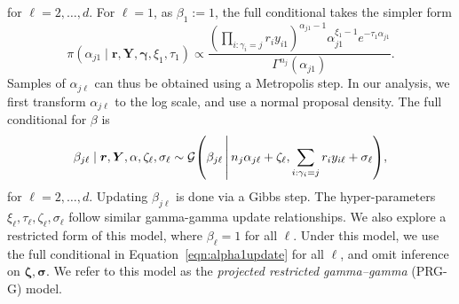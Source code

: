 for $\ell = 2,\ldots,d$.  For $\ell = 1$, as $\beta_{1} := 1$, the full conditional takes the simpler form
\begin{equation}
    \label{eqn:alpha1update}
    \pi(\alpha_{j1}\mid\bm{r},\bm{Y},\bm{\gamma},\xi_1,\tau_1)
    \propto \frac{\left(\prod_{i:\gamma_i = j}r_iy_{i1}\right)^{\alpha_{j1} - 1}\alpha_{j1}^{\xi_1 - 1}e^{-\tau_1\alpha_{j1}}}{\Gamma^{n_j}(\alpha_{j1})}.
\end{equation}
Samples of $\alpha_{j\ell}$ can thus be obtained using a Metropolis step. In our analysis, we first transform $\alpha_{j\ell}$ to the log scale, and use a normal proposal density.
The full conditional for $\beta$ is 
\begin{equation}
    \label{eqn:betafc}
    \beta_{j\ell}\mid\bm{r},\bm{Y},\alpha,\zeta_{\ell},\sigma_{\ell}
    \sim \mathcal{G}\left(\beta_{j\ell}\bigmid n_j\alpha_{j\ell} + \zeta_\ell, \sum_{i:\gamma_i = j}r_iy_{i\ell} + \sigma_{\ell}\right),
\end{equation}
for $\ell = 2,\ldots, d$.  Updating $\beta_{j\ell}$ is done via a Gibbs step.  The hyper-parameters
$\xi_{\ell},\tau_{\ell},\zeta_{\ell},\sigma_{\ell}$ follow similar gamma-gamma update relationships.
We also explore a restricted form of this model, where $\beta_{\ell} = 1$ for all $\ell$.  Under this 
model, we use the full conditional in Equation~\eqref{eqn:alpha1update} for all $\ell$, and omit 
inference on $\bm{\zeta},\bm{\sigma}$.  We refer to this model as the 
\emph{projected restricted gamma--gamma} (PRG-G) model.

